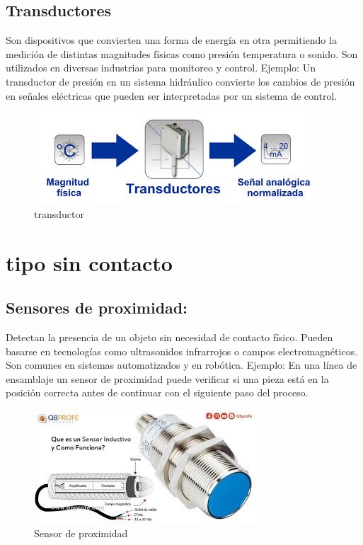 \subsection{Transductores }
Son dispositivos que convierten una forma de energía en otra permitiendo la medición de distintas magnitudes físicas como presión temperatura o sonido. Son utilizados en diversas industrias para monitoreo y control.
Ejemplo: Un transductor de presión en un sistema hidráulico convierte los cambios de presión en señales eléctricas que pueden ser interpretadas por un sistema de control.


\begin{figure}[h]
	\centering
	\includegraphics[width=0.7\linewidth]{img/transductor.jpg}
	\caption{transductor}
	\label{fig:insertarimagen}
\end{figure}

\section{tipo sin contacto}
\subsection{Sensores de proximidad:  }
Detectan la presencia de un objeto sin necesidad de contacto físico. Pueden basarse en tecnologías como ultrasonidos infrarrojos o campos electromagnéticos. Son comunes en sistemas automatizados y en robótica.
Ejemplo: En una línea de ensamblaje un sensor de proximidad puede verificar si una pieza está en la posición correcta antes de continuar con el siguiente paso del proceso.

\begin{figure}[h]
	\centering
	\includegraphics[width=0.7\linewidth]{img/sensor de proximidad.jpg}
	\caption{Sensor de proximidad}
	\label{fig:insertarimagen}
\end{figure}

